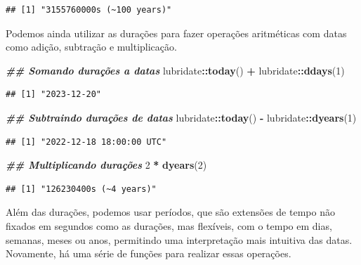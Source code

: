 \documentclass[
]{article}
\newenvironment{Shaded}{\begin{snugshade}}{\end{snugshade}}
\newcommand{\DecValTok}[1]{\textcolor[rgb]{0.00,0.00,0.81}{#1}}
\newcommand{\DocumentationTok}[1]{\textcolor[rgb]{0.56,0.35,0.01}{\textbf{\textit{#1}}}}
\newcommand{\FunctionTok}[1]{\textcolor[rgb]{0.13,0.29,0.53}{\textbf{#1}}}
\newcommand{\NormalTok}[1]{#1}
\newcommand{\SpecialCharTok}[1]{\textcolor[rgb]{0.81,0.36,0.00}{\textbf{#1}}}
\begin{document}
\begin{verbatim}
## [1] "3155760000s (~100 years)"
\end{verbatim}

Podemos ainda utilizar as durações para fazer operações aritméticas com datas como adição, subtração e multiplicação.

\begin{Shaded}
\begin{Highlighting}[]
\DocumentationTok{\#\# Somando durações a datas}
\NormalTok{lubridate}\SpecialCharTok{::}\FunctionTok{today}\NormalTok{() }\SpecialCharTok{+}\NormalTok{ lubridate}\SpecialCharTok{::}\FunctionTok{ddays}\NormalTok{(}\DecValTok{1}\NormalTok{)}
\end{Highlighting}
\end{Shaded}

\begin{verbatim}
## [1] "2023-12-20"
\end{verbatim}

\begin{Shaded}
\begin{Highlighting}[]
\DocumentationTok{\#\# Subtraindo durações de datas}
\NormalTok{lubridate}\SpecialCharTok{::}\FunctionTok{today}\NormalTok{() }\SpecialCharTok{{-}}\NormalTok{ lubridate}\SpecialCharTok{::}\FunctionTok{dyears}\NormalTok{(}\DecValTok{1}\NormalTok{)}
\end{Highlighting}
\end{Shaded}

\begin{verbatim}
## [1] "2022-12-18 18:00:00 UTC"
\end{verbatim}

\begin{Shaded}
\begin{Highlighting}[]
\DocumentationTok{\#\# Multiplicando durações}
\DecValTok{2} \SpecialCharTok{*} \FunctionTok{dyears}\NormalTok{(}\DecValTok{2}\NormalTok{)}
\end{Highlighting}
\end{Shaded}

\begin{verbatim}
## [1] "126230400s (~4 years)"
\end{verbatim}

Além das durações, podemos usar períodos, que são extensões de tempo não fixados em segundos como as durações, mas flexíveis, com o tempo em dias, semanas, meses ou anos, permitindo uma interpretação mais intuitiva das datas. Novamente, há uma série de funções para realizar essas operações.
\end{document}
